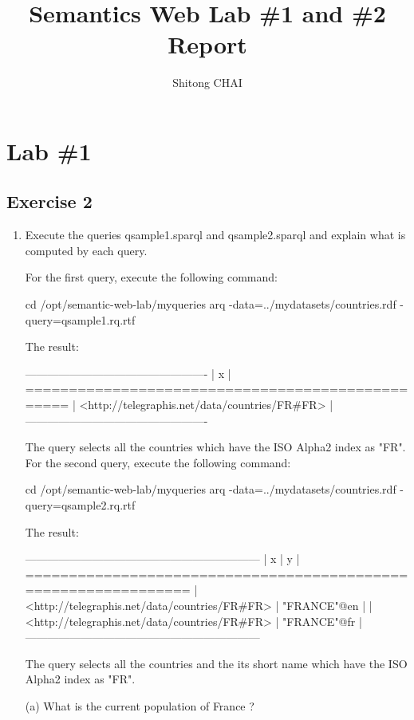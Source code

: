 \documentclass[a4paper, 12pt]{report}
\title{Semantics Web Lab \#1 and \#2 Report}
\date{}
\author{Shitong CHAI}
\begin{document}
\maketitle
\tableofcontents

\chapter{Lab \#1}
\section{Exercise 2}
\begin{enumerate}
\item Execute the queries qsample1.sparql and qsample2.sparql and explain what is computed by each query.

For the first query, execute the following command:
\begin{commandshell}
cd /opt/semantic-web-lab/myqueries
arq -data=../mydatasets/countries.rdf -query=qsample1.rq.rtf
\end{commandshell}
The result:
\begin{messageshell}
-------------------------------------------------
| x                                             |
=================================================
| <http://telegraphis.net/data/countries/FR#FR> |
-------------------------------------------------
\end{messageshell}
The query selects all the countries which have the ISO Alpha2 index as "FR".
For the second query, execute the following command:
\begin{commandshell}
cd /opt/semantic-web-lab/myqueries
arq -data=../mydatasets/countries.rdf -query=qsample2.rq.rtf
\end{commandshell}
The result:
\begin{messageshell}
---------------------------------------------------------------
| x                                             | y           |
===============================================================
| <http://telegraphis.net/data/countries/FR#FR> | "FRANCE"@en |
| <http://telegraphis.net/data/countries/FR#FR> | "FRANCE"@fr |
---------------------------------------------------------------
\end{messageshell}
The query selects all the countries and the its short name which have the ISO Alpha2 index as "FR".

\item[(a)] What is the current population of France ? 


\end{enumerate}
\end{document}

